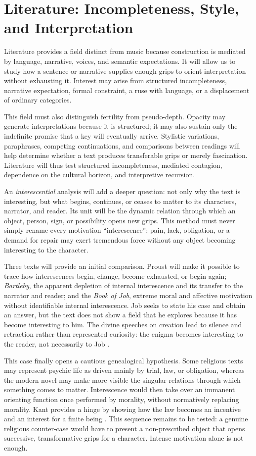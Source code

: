 \documentclass[11pt,a4paper]{article}
\begin{document}
\section{Literature: Incompleteness, Style, and Interpretation}

Literature provides a field distinct from music because construction is
mediated by language, narrative, voices, and semantic expectations. It will
allow us to study how a sentence or narrative supplies enough grips to orient
interpretation without exhausting it. Interest may arise from structured
incompleteness, narrative expectation, formal constraint, a ruse with language,
or a displacement of ordinary categories.

This field must also distinguish fertility from pseudo-depth. Opacity may
generate interpretations because it is structured; it may also sustain only the
indefinite promise that a key will eventually arrive. Stylistic variations,
paraphrases, competing continuations, and comparisons between readings will
help determine whether a text produces transferable grips or merely
fascination. Literature will thus test structured incompleteness, mediated
contagion, dependence on the cultural horizon, and interpretive recursion.

An \emph{interescential} analysis will add a deeper question: not only why the
text is interesting, but what begins, continues, or ceases to matter to its
characters, narrator, and reader. Its unit will be the dynamic relation through
which an object, person, sign, or possibility opens new grips. This method must
never simply rename every motivation ``interescence'': pain, lack, obligation,
or a demand for repair may exert tremendous force without any object becoming
interesting to the character.

Three texts will provide an initial comparison. Proust will make it possible to
trace how interescences begin, change, become exhausted, or begin again;
\emph{Bartleby}, the apparent depletion of internal interescence and its
transfer to the narrator and reader; and the \emph{Book of Job}, extreme moral
and affective motivation without identifiable internal interescence. Job seeks
to state his case and obtain an answer, but the text does not show a field that
he explores because it has become interesting to him. The divine speeches on
creation lead to silence and retraction rather than represented curiosity: the
enigma becomes interesting to the reader, not necessarily to Job
\parencite{jps1985tanakh}.

This case finally opens a cautious genealogical hypothesis. Some religious
texts may represent psychic life as driven mainly by trial, law, or obligation,
whereas the modern novel may make more visible the singular relations through
which something comes to matter. Interescence would then take over an immanent
orienting function once performed by morality, without normatively replacing
morality. Kant provides a hinge by showing how the law becomes an incentive and
an interest for a finite being \parencite{kant1848moralepratique}. This sequence
remains to be tested: a genuine religious counter-case would have to present a
non-prescribed object that opens successive, transformative grips for a
character. Intense motivation alone is not enough.
\end{document}
